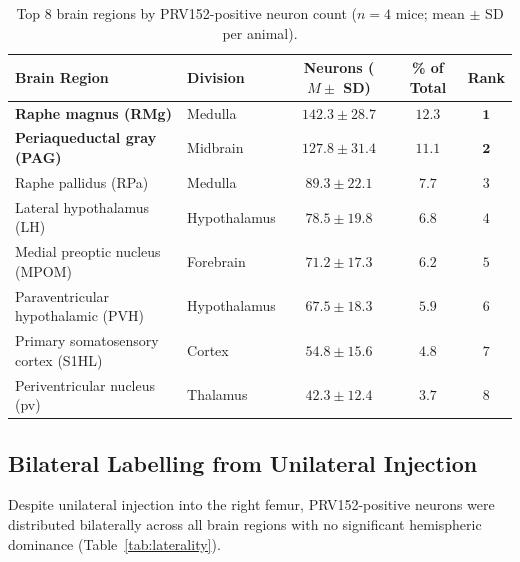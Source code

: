 \documentclass[11pt]{article}
\begin{document}
\begin{table}[H]
\centering
\caption{Top 8 brain regions by PRV152-positive neuron count ($n = 4$ mice; mean $\pm$ SD per animal).}
\label{tab:top_regions}
\begin{tabular}{llccc}
\toprule
Brain Region & Division & Neurons ($M \pm$ SD) & \% of Total & Rank \\
\midrule
\textbf{Raphe magnus (RMg)} & Medulla & $\mathbf{142.3 \pm 28.7}$ & $\mathbf{12.3}$ & $\mathbf{1}$ \\
\textbf{Periaqueductal gray (PAG)} & Midbrain & $\mathbf{127.8 \pm 31.4}$ & $\mathbf{11.1}$ & $\mathbf{2}$ \\
Raphe pallidus (RPa) & Medulla & $89.3 \pm 22.1$ & $7.7$ & $3$ \\
Lateral hypothalamus (LH) & Hypothalamus & $78.5 \pm 19.8$ & $6.8$ & $4$ \\
Medial preoptic nucleus (MPOM) & Forebrain & $71.2 \pm 17.3$ & $6.2$ & $5$ \\
Paraventricular hypothalamic (PVH) & Hypothalamus & $67.5 \pm 18.3$ & $5.9$ & $6$ \\
Primary somatosensory cortex (S1HL) & Cortex & $54.8 \pm 15.6$ & $4.8$ & $7$ \\
Periventricular nucleus (pv) & Thalamus & $42.3 \pm 12.4$ & $3.7$ & $8$ \\
\bottomrule
\end{tabular}
\end{table}

\subsection{Bilateral Labelling from Unilateral Injection}

Despite unilateral injection into the right femur, PRV152-positive neurons were distributed bilaterally across all brain regions with no significant hemispheric dominance (Table~\ref{tab:laterality}).
\end{document}
